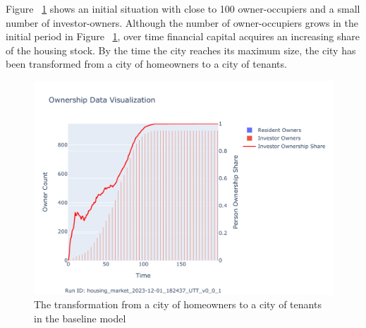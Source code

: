  Figure ~\ref{fig:Baseline_ownership_trajectory} shows an initial situation with close to 100 owner-occupiers and a small number of investor-owners. Although the number of owner-occupiers grows in the initial period in Figure ~\ref{fig:Baseline_ownership_trajectory}, over time financial capital acquires an increasing share of the housing stock. By the time the city reaches its maximum size, the city has been transformed from a city of homeowners to a city of tenants.



\begin{figure}
    \centering
    \hspace{4cm} %
    \includegraphics[scale=0.8, trim={0 1cm 0 1.8cm}, clip]{fig/Analysis/Ownership_Data_1.pdf}
    \caption{The transformation from a city of homeowners to a city of tenants in the baseline model}
    \label{fig:Baseline_ownership_trajectory}
\end{figure}








